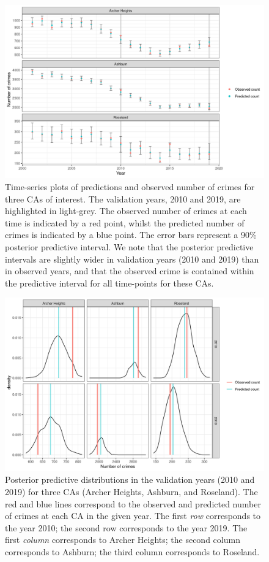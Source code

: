 \documentclass[article]{jss}
\begin{document}
\begin{figure}[t!]
    \centering
    \includegraphics[width = \linewidth]{img/Chicago_focused_CAs_time_series.png}
    \caption{Time-series plots of predictions and observed number of crimes for three CAs of interest. The validation years, 2010 and 2019, are highlighted in light-grey. The observed number of crimes at each time is indicated by a red point, whilst the predicted number of crimes is indicated by a blue point. The error bars represent a 90\% posterior predictive interval. We note that the posterior predictive intervals are slightly wider in validation years (2010 and 2019) than in observed years, and that the observed crime is contained within the predictive interval for all time-points for these CAs. 
}   
  \label{fig:chicago_time_series}
\end{figure}

\begin{figure}[t!]
    \centering
    \includegraphics[width = \linewidth]{img/Chicago_focused_CAs_predictive_distributions.png}
    \caption{Posterior predictive distributions in the validation years (2010 and 2019) for three CAs (Archer Heights, Ashburn, and Roseland). The red and blue lines correspond to the observed and predicted number of crimes at each CA in the given year. 
    The first \textit{row} corresponds to the year 2010; the second row corresponds to the year 2019. The first \textit{column} corresponds to Archer Heights; the second column corresponds to Ashburn; the third column corresponds to Roseland. 
}   
  \label{fig:chicago_predictive_distributions}
\end{figure}
\end{document}
